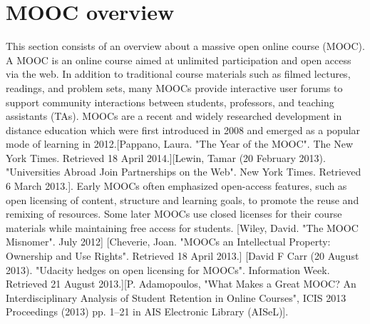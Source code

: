 \section{MOOC overview}
\label{sec:mooc_overview}

This section consists of an overview about a massive open online course (MOOC). A MOOC is an online course aimed at unlimited participation and open access via the web. In addition to traditional course materials such as filmed lectures, readings, and problem sets, many MOOCs provide interactive user forums to support community interactions between students, professors, and teaching assistants (TAs). MOOCs are a recent and widely researched development in distance education which were first introduced in 2008 and emerged as a popular mode of learning in 2012.[Pappano, Laura. "The Year of the MOOC". The New York Times. Retrieved 18 April 2014.][Lewin, Tamar (20 February 2013). "Universities Abroad Join Partnerships on the Web". New York Times. Retrieved 6 March 2013.]. Early MOOCs often emphasized open-access features, such as open licensing of content, structure and learning goals, to promote the reuse and remixing of resources. Some later MOOCs use closed licenses for their course materials while maintaining free access for students.  [Wiley, David. "The MOOC Misnomer". July 2012] [Cheverie, Joan. "MOOCs an Intellectual Property: Ownership and Use Rights". Retrieved 18 April 2013.] [David F Carr (20 August 2013). "Udacity hedges on open licensing for MOOCs". Information Week. Retrieved 21 August 2013.][P. Adamopoulos, "What Makes a Great MOOC? An Interdisciplinary Analysis of Student Retention in Online Courses", ICIS 2013 Proceedings (2013) pp. 1–21 in AIS Electronic Library (AISeL)].

